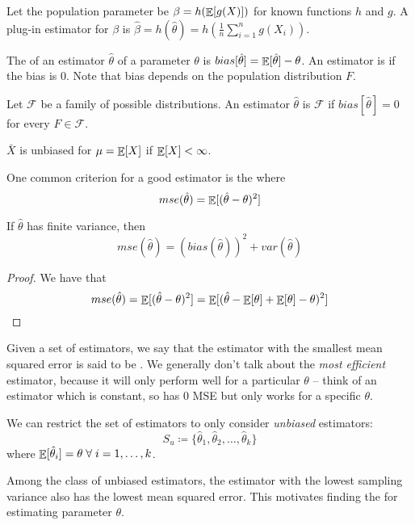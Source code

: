 \documentclass[10pt]{article}
\begin{document}
Let the population parameter be $\beta = h(\mathop{\mathbb{E}}[g(X)])$ for known functions $h$ and $g$. A plug-in estimator for $\beta$ is $\hat{\beta} = h(\hat{\theta}) = h( \frac{1}{n} \sum_{i=1}^n g(X_i))$.

\begin{definition}
	The  of an estimator $\hat{\theta}$ of a parameter $\theta$ is $bias[\hat{\theta}] = \mathop{\mathbb{E}}[\hat{\theta}] - \theta$. An estimator is  if the bias is 0. Note that bias depends on the population distribution $F$.
\end{definition}

\begin{definition}
Let $\mathcal{F}$ be a family of possible distributions. An estimator $\hat{\theta}$ is  $\mathcal{F}$ if $bias[\hat{\theta}] = 0$ for every $F \in \mathcal{F}$.
\end{definition}

\begin{theorem}
	$\bar{X}$ is unbiased for $\mu = \mathop{\mathbb{E}}[X]$ if $\mathop{\mathbb{E}}[X] < \infty$.
\end{theorem}

One common criterion for a good estimator is the  where 
\[
mse(\hat{\theta}) = \mathop{\mathbb{E}}[(\hat{\theta} - \theta)^2] 
\]

\begin{theorem}
If $\hat{\theta}$ has finite variance, then
	\[
	mse(\hat{\theta}) =(bias(\hat{\theta}))^2 + var(\hat{\theta})
	\]
\end{theorem}
\begin{proof}
	We have that
	\[
	mse(\hat{\theta}) = \mathop{\mathbb{E}}[(\hat{\theta} - \theta)^2]  = \mathop{\mathbb{E}}[ (\hat{\theta} - \mathop{\mathbb{E}}[\theta] + \mathop{\mathbb{E}}[\theta] - \theta)^2]
	\]
\end{proof}

Given a set of estimators, we say that the estimator with the smallest mean squared error is said to be . We generally don't talk about the \emph{most efficient} estimator, because it will only perform well for a particular $\theta$ -- think of an estimator which is constant, so has 0 MSE but only works for a specific $\theta$.

We can restrict the set of estimators to only consider \emph{unbiased} estimators:
\[
S_u \coloneqq \{\hat{\theta}_1, \hat{\theta}_2, \dots, \hat{\theta}_k\}
\]
where $\expect[\hat{\theta}_i] = \theta \forall i = 1,\dots,k$.

Among the class of unbiased estimators, the estimator with the lowest sampling variance also has the lowest mean squared error. This motivates finding the  for estimating parameter $\theta$. 
\end{document}

